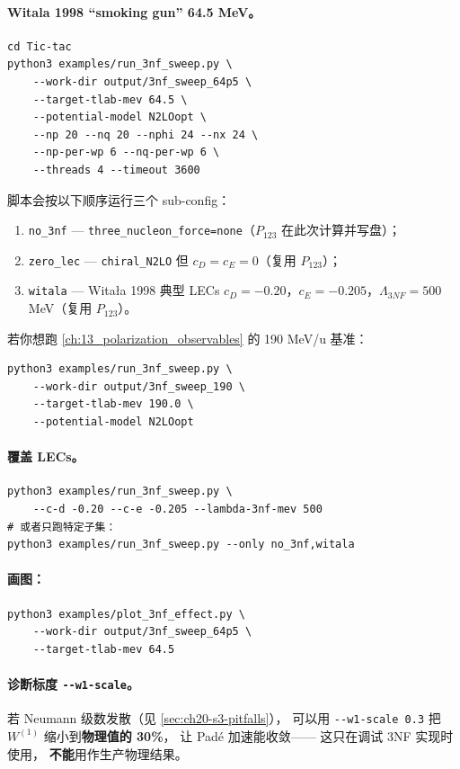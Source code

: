 \paragraph{Witala 1998 “smoking gun” 64.5 MeV。}
\begin{lstlisting}[style=config,caption={3NF 三配置扫描（no\_3nf / zero\_lec / witala）共享 P\_123 缓存。}]
cd Tic-tac
python3 examples/run_3nf_sweep.py \
    --work-dir output/3nf_sweep_64p5 \
    --target-tlab-mev 64.5 \
    --potential-model N2LOopt \
    --np 20 --nq 20 --nphi 24 --nx 24 \
    --np-per-wp 6 --nq-per-wp 6 \
    --threads 4 --timeout 3600
\end{lstlisting}
脚本会按以下顺序运行三个 sub-config：
\begin{enumerate}
  \item \texttt{no\_3nf} — \texttt{three\_nucleon\_force=none}（$P_{123}$ 在此次计算并写盘）；
  \item \texttt{zero\_lec} — \texttt{chiral\_N2LO} 但 $c_D = c_E = 0$（复用 $P_{123}$）；
  \item \texttt{witala} — Witała 1998 典型 LECs $c_D = -0.20$，$c_E = -0.205$，$\Lambda_{3NF} = 500$ MeV（复用 $P_{123}$）。
\end{enumerate}
若你想跑 \cref{ch:13_polarization_observables} 的 190 MeV/u 基准：
\begin{lstlisting}[style=config]
python3 examples/run_3nf_sweep.py \
    --work-dir output/3nf_sweep_190 \
    --target-tlab-mev 190.0 \
    --potential-model N2LOopt
\end{lstlisting}

\paragraph{覆盖 LECs。}
\begin{lstlisting}[style=config]
python3 examples/run_3nf_sweep.py \
    --c-d -0.20 --c-e -0.205 --lambda-3nf-mev 500
# 或者只跑特定子集：
python3 examples/run_3nf_sweep.py --only no_3nf,witala
\end{lstlisting}

\paragraph{画图：}
\begin{lstlisting}[style=config]
python3 examples/plot_3nf_effect.py \
    --work-dir output/3nf_sweep_64p5 \
    --target-tlab-mev 64.5
\end{lstlisting}

\paragraph{诊断标度 \texttt{-{}-w1-scale}。}
若 Neumann 级数发散（见 \cref{sec:ch20-s3-pitfalls}），
可以用 \texttt{-{}-w1-scale 0.3} 把 $W^{(1)}$ 缩小到\textbf{物理值的 30\%}，
让 Padé 加速能收敛——
这只在调试 3NF 实现时使用，
\textbf{不能}用作生产物理结果。

